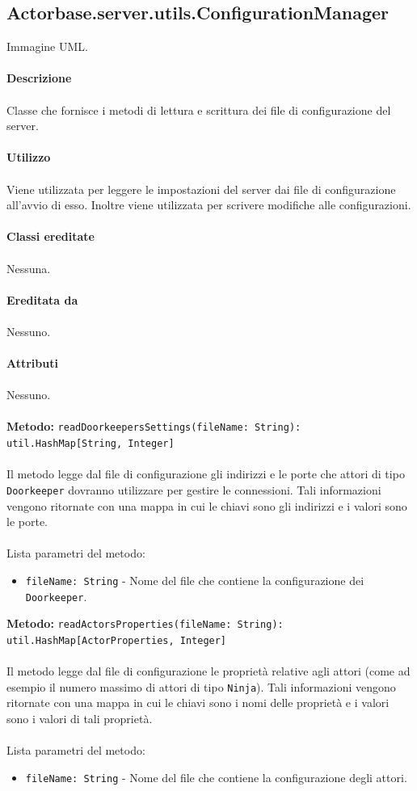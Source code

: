 \documentclass[a4paper]{article}
\begin{document}
	\subsection{Actorbase.server.utils.ConfigurationManager}
		Immagine UML.
		\\ \\
		\textbf{Descrizione}
			\\ \\
			Classe che fornisce i metodi di lettura e scrittura dei file di configurazione del server.
			\\ \\
		\textbf{Utilizzo}
			\\ \\
			Viene utilizzata per leggere le impostazioni del server dai file di configurazione all'avvio di esso. Inoltre viene utilizzata per scrivere modifiche alle configurazioni.
			\\ \\
		\textbf{Classi ereditate}
			\\ \\
			Nessuna.
			\\ \\
		\textbf{Ereditata da}
			\\ \\
			Nessuno.
			\\ \\
		\textbf{Attributi}
			\\ \\
			Nessuno.
			\\ \\
		\textbf{Metodo: }\texttt{readDoorkeepersSettings(fileName: String): util.HashMap[String, Integer]}
			\\ \\
			Il metodo legge dal file di configurazione gli indirizzi e le porte che attori di tipo \texttt{Doorkeeper} dovranno utilizzare per gestire le connessioni. Tali informazioni vengono ritornate con una mappa in cui le chiavi sono gli indirizzi e i valori sono le porte.
			\\ \\
			Lista parametri del metodo:
			\begin{itemize}
				\item \texttt{fileName: String} - Nome del file che contiene la configurazione dei \texttt{Doorkeeper}.
			\end{itemize}
		\textbf{Metodo: }\texttt{readActorsProperties(fileName: String): util.HashMap[ActorProperties, Integer]}
			\\ \\
			Il metodo legge dal file di configurazione le proprietà relative agli attori (come ad esempio il numero massimo di attori di tipo \texttt{Ninja}). Tali informazioni vengono ritornate con una mappa in cui le chiavi sono i nomi delle proprietà e i valori sono i valori di tali proprietà.
			\\ \\
			Lista parametri del metodo:
			\begin{itemize}
				\item \texttt{fileName: String} - Nome del file che contiene la configurazione degli attori.
			\end{itemize}
			
\end{document}
